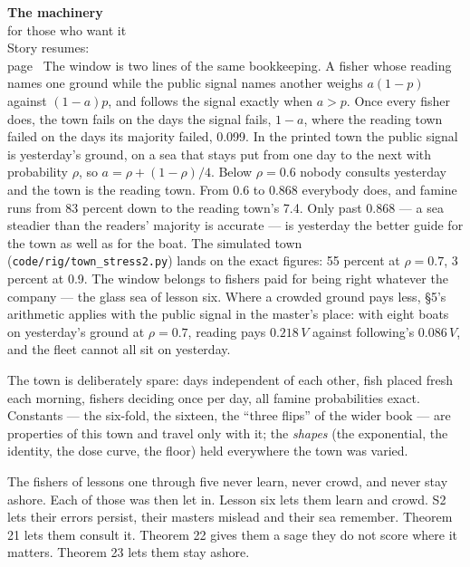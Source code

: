 \begin{machinery}{\textbf{The machinery}\\for those who want it\\[3pt]{\color{muted}Story resumes:\\page~\pageref{ch12}}}
The window is two lines of the same bookkeeping. A fisher whose
reading names one ground while the public signal names another weighs \(a(1-p)\) against \((1-a)p\), and follows the signal exactly when \(a > p\).
Once every fisher does, the town fails on the days the signal fails, \(1-a\), where the reading town failed on the days its majority failed,
0.099. In the printed town the public signal is yesterday's ground, on
a sea that stays put from one day to the next with probability \(\rho\), so \(a = \rho + (1-\rho)/4\). Below \(\rho = 0.6\) nobody consults yesterday and the
town is the reading town. From 0.6 to 0.868 everybody does, and famine
runs from 83 percent down to the reading town's 7.4. Only past 0.868 ---
a sea steadier than the readers' majority is accurate --- is yesterday
the better guide for the town as well as for the boat. The simulated
town (\texttt{code/\allowbreak{}rig/\allowbreak{}town\_\allowbreak{}stress2.\allowbreak{}py}) lands on the exact figures: 55
percent at \(\rho = 0.7\), 3 percent at 0.9. The window belongs to fishers
paid for being right whatever the company --- the glass sea of lesson
six. Where a crowded ground pays less, §5's arithmetic applies with
the public signal in the master's place: with eight boats on
yesterday's ground at \(\rho = 0.7\), reading pays \(0.218\,V\) against following's \(0.086\,V\), and the fleet cannot all sit on yesterday.



The town is deliberately spare: days independent of each other, fish
placed fresh each morning, fishers deciding once per day, all famine
probabilities exact. Constants --- the six-fold, the sixteen, the
``three flips'' of the wider book --- are properties of this town and
travel only with it; the \emph{shapes} (the exponential, the identity, the
dose curve, the floor) held everywhere the town was varied.

The fishers of lessons one through five never learn, never crowd, and
never stay ashore. Each of those was then let in. Lesson six lets them
learn and crowd. S2 lets their errors persist, their masters mislead
and their sea remember. Theorem 21 lets them consult it. Theorem 22
gives them a sage they do not score where it matters. Theorem 23 lets
them stay ashore.


\end{machinery}
